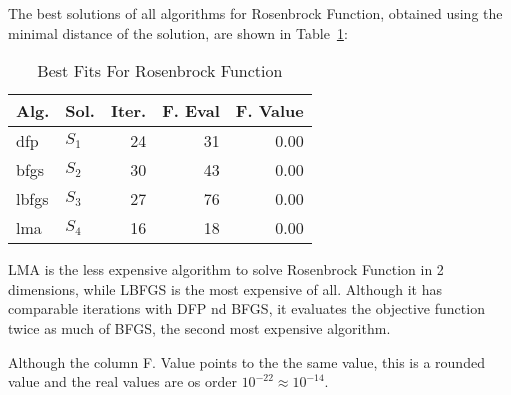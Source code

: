 
The best solutions of all algorithms for Rosenbrock Function, obtained using the minimal
distance of the solution, are shown in Table~\ref{solutions:rosenbrock2d}:

\begin{table}[H]
\centering
\caption{Best Fits For Rosenbrock Function}
\label{solutions:rosenbrock2d}
\begin{tabular}{llrrr}
\toprule
 Alg. &    Sol. &  Iter. &  F. Eval &  F. Value \\
\midrule
  dfp & $S_{1}$ &     24 &       31 &      0.00 \\
 bfgs & $S_{2}$ &     30 &       43 &      0.00 \\
lbfgs & $S_{3}$ &     27 &       76 &      0.00 \\
  lma & $S_{4}$ &     16 &       18 &      0.00 \\
\bottomrule
\end{tabular}
\end{table}

LMA is the less expensive algorithm to solve Rosenbrock Function in 2 dimensions, while LBFGS
is the most expensive of all. Although it has comparable iterations with DFP nd BFGS, it evaluates
the objective function twice as much of BFGS, the second most expensive algorithm.

Although the column F. Value points to the the same value, this is a rounded value
and the real values are os order $10^{-22} \approx 10^{-14}$.